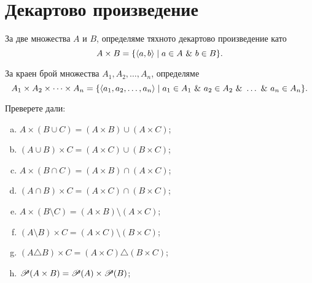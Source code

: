 

\section{Декартово произведение}
За две множества $A$ и $B$, определяме тяхното декартово произведение като
\[A\times B = \{\langle{a,b}\rangle\mid a\in A\ \&\ b\in B\}.\]

За краен брой множества $A_1,A_2,\dots,A_n$, определяме
\[A_1\times A_2\times\cdots\times A_n = \{\pair{a_1,a_2,\dots,a_n}\mid a_1 \in A_1\ \&\ a_2\in A_2\ \&\ \dots\ \&\ a_n \in A_n\}.\]


\begin{problem}
  Преверете дали:
  \begin{enumerate}[a)]
  \item 
    $A\times(B\cup C) = (A\times B) \cup (A\times C)$;
  \item
    $(A\cup B)\times C = (A\times C)\cup (B\times C)$;
  \item 
    $A\times(B\cap C) = (A\times B) \cap (A\times C)$;
  \item
    $(A \cap B)\times C = (A \times C)\cap(B\times C)$;
  \item 
    $A\times(B\setminus C) = (A\times B) \setminus (A\times C)$;
  \item
    $(A\setminus B)\times C = (A\times C)\setminus (B\times C)$;
  \item
    $(A\triangle B)\times C = (A\times C)\triangle (B\times C)$;
  \item
    $\mathscr{P}(A \times B) = \mathscr{P}(A) \times \mathscr{P}(B)$;
  \end{enumerate}
\end{problem}

